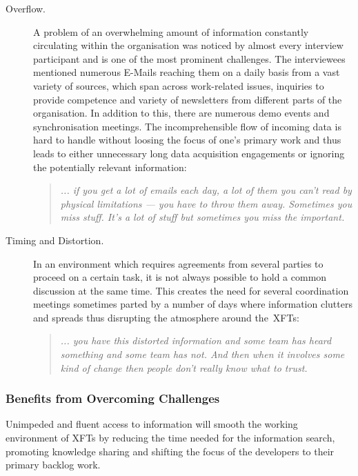 \begin{description}
   \item[Overflow.] A problem of an overwhelming amount of information constantly circulating within the organisation was noticed by almost every interview participant and is one of the most prominent challenges. The interviewees mentioned numerous E-Mails reaching them on a daily basis from a vast variety of sources, which span across work-related issues, inquiries to provide competence and variety of newsletters from different parts of the organisation. In addition to this, there are numerous demo events and synchronisation meetings. The incomprehensible flow of incoming data is hard to handle without loosing the focus of one's primary work and thus leads to either unnecessary long data acquisition engagements or ignoring the potentially relevant information:
   
      \begin{quote}\itshape ... if you get a lot of emails each day, a lot of them you can’t read by physical limitations — you have to throw them away. Sometimes you miss stuff. It’s a lot of stuff but sometimes you miss the important.
      \end{quote}

   \item[Timing and Distortion.] In an environment which requires agreements from several parties to proceed on a certain task, it is not always possible to hold a common discussion at the same time. This creates the need for several coordination meetings sometimes parted by a number of days where information clutters and spreads thus disrupting the atmosphere around the~\acp{XFT}:
      
      \begin{quote}\itshape ... you have this distorted information and some team has heard something and some team has not. And then when it involves some kind of change then people don't really know what to trust.
      \end{quote}

\end{description}

\subsubsection{Benefits from Overcoming Challenges}

Unimpeded and fluent access to information will smooth the working environment of \acp{XFT} by reducing the time needed for the information search, promoting knowledge sharing and shifting the focus of the developers to their primary backlog work.

